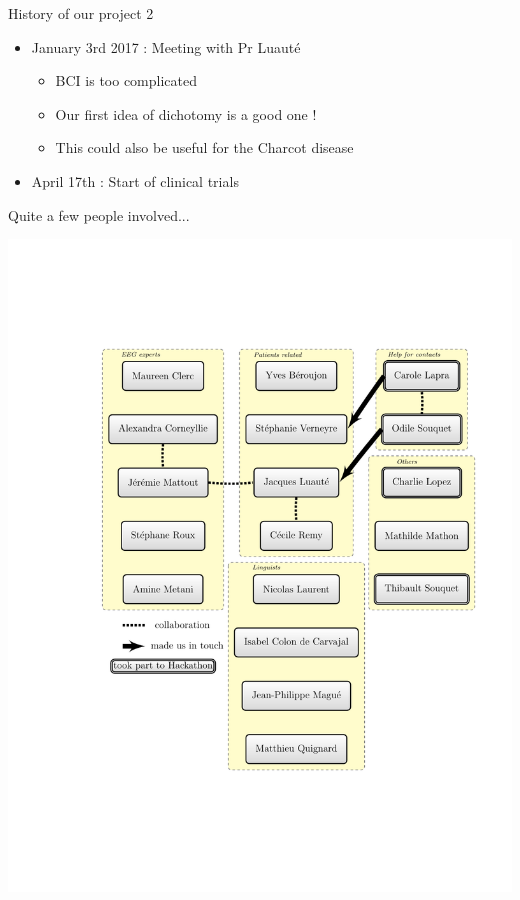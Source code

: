 \documentclass[graphics]{beamer}
\begin{document}
\begin{frame}{History of our project 2}
	\begin{itemize}
		\item January 3rd 2017 : Meeting with Pr Luauté
		\begin{itemize}
			\item BCI is too complicated
			\item Our first idea of dichotomy is a good one !
			\item This could also be useful for the Charcot disease
		\end{itemize}
		\pause
		\item April 17th : Start of clinical trials
	\end{itemize}
\end{frame}

\begin{frame}{Quite a few people involved...}
	\begin{center}
		\vspace{-2cm}
		\hspace{-1cm}
		\includegraphics[scale=0.4]{graphe_intervenants.pdf}
	\end{center}
\end{frame}
\end{document}
